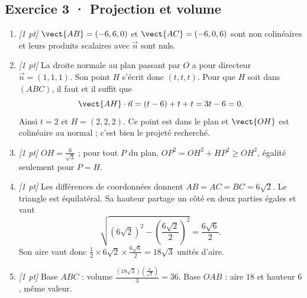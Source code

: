 \subsection*{Exercice 3 · Projection et volume}\begin{enumerate}

\item \textit{[1 pt]} $\vect{AB}=(-6,6,0)$ et $\vect{AC}=(-6,0,6)$ sont non colinéaires et leurs produits scalaires avec $\vec n$ sont nuls.

\item \textit{[1 pt]} La droite normale au plan passant par $O$ a pour directeur $\vec n=(1,1,1)$. Son point $H$ s'écrit donc $(t,t,t)$. Pour que $H$ soit dans $(ABC)$, il faut et il suffit que
\[\vect{AH}\cdot\vec n=(t-6)+t+t=3t-6=0.\]
Ainsi $t=2$ et $H=(2,2,2)$. Ce point est dans le plan et $\vect{OH}$ est colinéaire au normal ; c'est bien le projeté recherché.

\item \textit{[1 pt]} $OH=\frac{6}{\sqrt{3}}$ ; pour tout $P$ du plan, $OP^2=OH^2+HP^2\ge OH^2$, égalité seulement pour $P=H$.

\item \textit{[1 pt]} Les différences de coordonnées donnent $AB=AC=BC=6\sqrt2$. Le triangle est équilatéral. Sa hauteur partage un côté en deux parties égales et vaut
\[\sqrt{(6\sqrt2)^2-(\frac{6\sqrt{2}}{2})^2}=\frac{6\sqrt6}{2}.\]
Son aire vaut donc $\frac12\times 6\sqrt2\times\frac{6\sqrt6}{2}=18\sqrt3$ unités d'aire.

\item \textit{[1 pt]} Base $ABC$ : volume $\frac{(18\sqrt3)(\frac{6}{\sqrt{3}})}{3}=36$. Base $OAB$ : aire $18$ et hauteur $6$, même valeur.

\end{enumerate}

